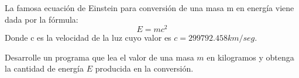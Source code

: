 La famosa ecuación de Einstein para conversión de una masa m en energía viene dada por la fórmula:
\[E = mc^2\]
Donde c es la velocidad de la luz cuyo valor es $c = 299792.458 km/seg$.

Desarrolle un programa que lea el valor de una masa $m$ en kilogramos y obtenga la cantidad de energía $E$ producida en la conversión.
